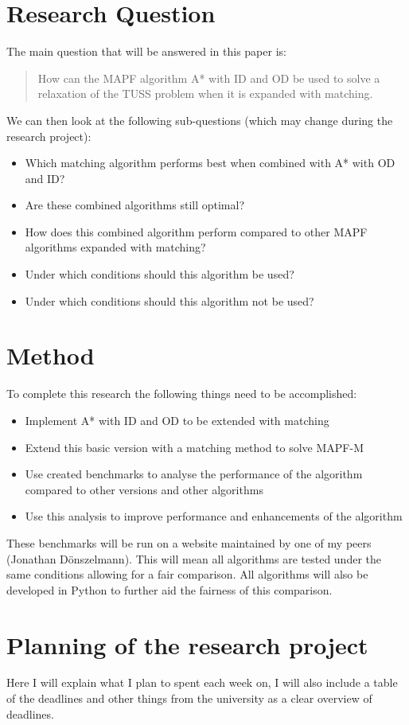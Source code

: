 \documentclass[english]{article}
\begin{document}
\section{Research Question}
The main question that will be answered in this paper is: 
\begin{quote}
	How can the MAPF algorithm A* with ID and OD be used to solve a relaxation of the TUSS problem when it is expanded with matching.
\end{quote}
We can then look at the following sub-questions (which may change during the research project):
\begin{itemize}
	\item Which matching algorithm performs best when combined with A* with OD and ID?
	\item Are these combined algorithms still optimal?
	\item How does this combined algorithm perform compared to other MAPF algorithms expanded with matching?
	\item Under which conditions should this algorithm be used?
	\item Under which conditions should this algorithm not be used?
\end{itemize}

\section{Method}
To complete this research the following things need to be accomplished:
\begin{itemize}
	\item Implement A* with ID and OD to be extended with matching
	\item Extend this basic version with a matching method to solve MAPF-M
	\item Use created benchmarks to analyse the performance of the algorithm compared to other versions and other algorithms
	\item Use this analysis to improve performance and enhancements of the algorithm
\end{itemize}

These benchmarks will be run on a website maintained by one of my peers (Jonathan D\"onszelmann). This will mean all algorithms are tested under the same conditions allowing for a fair comparison. All algorithms will also be developed in Python to further aid the fairness of this comparison.

\section{Planning of the research project}
Here I will explain what I plan to spent each week on, I will also include a table of the deadlines and other things from the university as a clear overview of deadlines.
\end{document}
